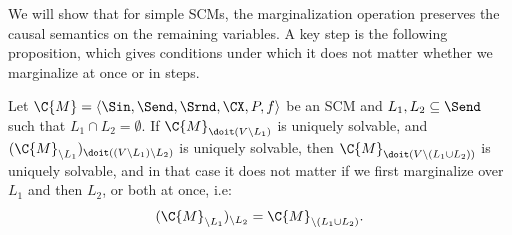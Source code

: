 We will show that for simple SCMs, the marginalization operation preserves the causal semantics on the remaining variables. 
A key step is the following proposition, which gives conditions under which it does not matter whether we marginalize at once or in steps.
\begin{Prp}\label{prp:marginalization_commutes}
  Let $\C{M} = \langle \Sin, \Send, \Srnd, \CX, P, f \rangle$ be an SCM and $L_1, L_2 \subseteq \Send$ such that $L_1 \cap L_2 = \emptyset$.
  If $\C{M}_{\doit(V\setminus L_1)}$ is uniquely solvable, and
  $(\C{M}_{\setminus L_1})_{\doit((V\setminus L_1)\setminus L_2)}$ is uniquely solvable, then $\C{M}_{\doit(V\setminus(L_1\cup L_2))}$ is uniquely solvable, and in that case it does not matter if we first marginalize over $L_1$ and then $L_2$, or both at once, i.e:
  $$(\C{M}_{\setminus L_1})_{\setminus L_2} = \C{M}_{\setminus (L_1\cup L_2)}.$$
\end{Prp}
